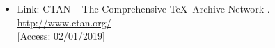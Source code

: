 \documentclass[a4paper,10pt,handout]{beamer}
\begin{document}
\begin{frame}[allowframebreaks]
{\begin{itemize}



%
%		
%		
%		
%		
%		


		\item Link: CTAN -- The Comprehensive \TeX\ Archive Network .\\
		\url{http://www.ctan.org/}\\
		{[}Access: 02/01/2019]


\end{itemize}}
\end{frame}
\end{document}
